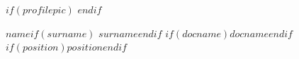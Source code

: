 \newcommand{\vitaeentry}[5]{%
  \cventryhead{#1}{#2}{#3}{#4}
  \vspace{-8pt}
  \textcolor{softcol}{\hrule}
  \vspace{6pt}
  #5
  \vspace{3pt}}

\newcommand{\vitaebrief}[4]{%
  \cventryhead{#1}{#2}{#3}{#4}
  \vspace{2pt}}

\newcommand{\vitaeskill}[2]{\cvskillrow{#1}{#2}}

\newenvironment{vitaewhy}{%
  \begin{itemize}[label=\textperiodcentered, topsep=0pt, partopsep=0pt, itemsep=2pt,
                  parsep=0pt, leftmargin=1.2em, labelsep=0.5em]%
}{%
  \end{itemize}%
}

\newlength{\cvpicwidth}
\newlength{\cvpicgap}
\setlength{\cvpicgap}{1.5em}



$if(profilepic)$
\setlength{\cvpicwidth}{$if(profilepic-width)$$profilepic-width$$else$0.22\linewidth$endif$}
$endif$

\vspace{-8pt}
\begin{center}
  \HUGE \textsc{$name$$if(surname)$ $surname$$endif$}%
  $if(docname)$\cvtitlerule\textsc{$docname$}$endif$\\[2pt]
  $if(position)$\small $position$$endif$
\end{center}

